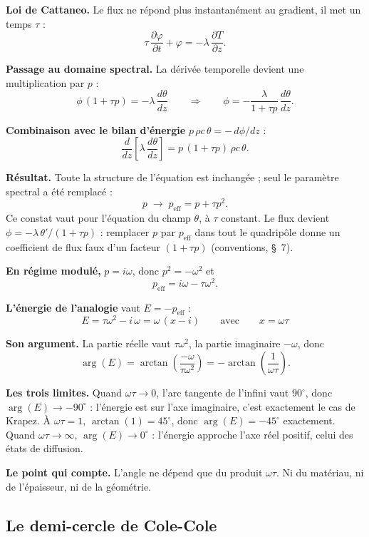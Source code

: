 \documentclass[11pt,a4paper]{article}
\begin{document}
\textbf{Loi de Cattaneo.} Le flux ne répond plus instantanément au gradient, il met un temps $\tau$ :
\[ \tau\,\frac{\partial\varphi}{\partial t} + \varphi = -\lambda\,\frac{\partial T}{\partial z} . \]

\textbf{Passage au domaine spectral.} La dérivée temporelle devient une multiplication par $p$ :
\[ \phi\,(1 + \tau p) = -\lambda\,\frac{d\theta}{dz}
\qquad\Longrightarrow\qquad
\phi = -\frac{\lambda}{1+\tau p}\,\frac{d\theta}{dz} . \]

\textbf{Combinaison avec le bilan d'énergie} $p\,\rho c\,\theta = -\,d\phi/dz$ :
\[ \frac{d}{dz}\!\left[\lambda\,\frac{d\theta}{dz}\right] = p\,(1+\tau p)\,\rho c\,\theta . \]

\textbf{Résultat.} Toute la structure de l'équation est inchangée ; seul le paramètre spectral a été
remplacé :
\[ p \;\longrightarrow\; p_{\text{eff}} = p + \tau p^{2} . \]
Ce constat vaut pour l'équation du champ $\theta$, à $\tau$ constant. Le flux devient
$\phi=-\lambda\,\theta'/(1+\tau p)$ : remplacer $p$ par $p_{\text{eff}}$ dans tout le quadripôle
donne un coefficient de flux faux d'un facteur $(1+\tau p)$ (conventions, §~7).

\textbf{En régime modulé,} $p = i\omega$, donc $p^{2} = -\omega^{2}$ et
\[ p_{\text{eff}} = i\omega - \tau\omega^{2} . \]

\textbf{L'énergie de l'analogie} vaut $E = -p_{\text{eff}}$ :
\[ \boxed{\; E = \tau\omega^{2} - i\,\omega = \omega\,(x - i)
\qquad\text{avec}\qquad x = \omega\tau \;} \]

\textbf{Son argument.} La partie réelle vaut $\tau\omega^{2}$, la partie imaginaire $-\omega$, donc
\[ \arg(E) = \arctan\!\left(\frac{-\omega}{\tau\omega^{2}}\right)
= -\arctan\!\left(\frac{1}{\omega\tau}\right) . \]

\textbf{Les trois limites.} Quand $\omega\tau \to 0$, l'arc tangente de l'infini vaut $90^{\circ}$,
donc $\arg(E) \to -90^{\circ}$ : l'énergie est sur l'axe imaginaire, c'est exactement le cas de Krapez.
À $\omega\tau = 1$, $\arctan(1) = 45^{\circ}$, donc $\arg(E) = -45^{\circ}$ exactement. Quand
$\omega\tau \to \infty$, $\arg(E) \to 0^{\circ}$ : l'énergie approche l'axe réel positif, celui des
états de diffusion.

\textbf{Le point qui compte.} L'angle ne dépend que du produit $\omega\tau$. Ni du matériau, ni de
l'épaisseur, ni de la géométrie.

\newpage
\subsection{Le demi-cercle de Cole-Cole}
\end{document}
